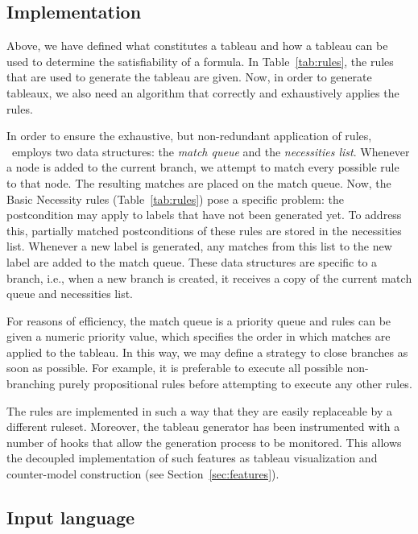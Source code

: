 \subsection{Implementation}
\label{sec:implementation}

Above, we have defined what constitutes a tableau and how a tableau can be used
to determine the satisfiability of a formula. In Table~\ref{tab:rules}, the
rules that are used to generate the tableau are given. Now, in order to
generate tableaux, we also need an algorithm that correctly and exhaustively
applies the rules.

In order to ensure the exhaustive, but non-redundant application of rules,
\oops\ employs two data structures: the {\em match queue} and the {\em
necessities list}.
Whenever a node is added to the current branch, we attempt to match every
possible
rule to that node. The resulting matches are placed on the match queue. Now,
the Basic Necessity rules (Table~\ref{tab:rules}) pose a specific problem:
the postcondition may apply to labels that have not been generated yet. To
address this, partially matched postconditions of these rules are stored in
the necessities list. Whenever a new label is generated, any matches from this
list to the new label are added to the match queue.
These data structures are specific to a branch, i.e., when
a new branch is created, it receives a copy of the current match queue and
necessities list.

For reasons of efficiency,
the match queue is a priority queue and rules can be given a numeric
priority value, which specifies the order in which matches are applied to the
tableau. In this way, we may define a strategy to close branches as soon as
possible. For example, it is preferable to execute all possible non-branching
purely propositional rules before attempting to execute any other rules.

The rules are implemented in such a way that they are easily replaceable by a
different ruleset. Moreover, the tableau generator has been instrumented with
a number of hooks that allow the generation process to be monitored. This
allows the decoupled implementation of such features as tableau visualization
and counter-model construction (see Section~\ref{sec:features}).

\subsection{Input language}
\label{sec:language}

